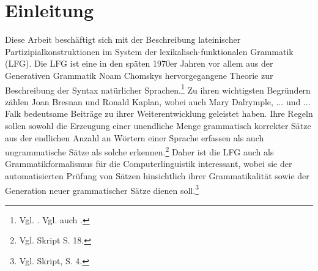 \documentclass[12pt,a4paper]{article}
\begin{document}

\setcounter{page}{2}
\begingroup
\flushbottom
\tableofcontents
\thispagestyle{empty}
\pagebreak
\endgroup

\nocite{Menge}
\nocite{LHS}
\nocite{KSt}
\nocite{Rohrer}
\nocite{Skript}
\nocite{Dal}
\nocite{Falk}
\nocite{Bresnan}
\nocite{Snijders}



\section{Einleitung}
Diese Arbeit beschäftigt sich mit der Beschreibung lateinischer Partizipialkonstruktionen im System der lexikalisch-funktionalen Grammatik (LFG). Die LFG ist eine in den späten 1970er Jahren vor allem aus der Generativen Grammatik Noam Chomskys hervorgegangene Theorie zur Beschreibung der Syntax natürlicher Sprachen.\footnote{Vgl. \cite[4]{Skript}. Vgl. auch \cite[1]{Dal}.} Zu ihren wichtigsten Begründern zählen Joan Bresnan und Ronald Kaplan, wobei auch Mary Dalrymple, ... und ... Falk bedeutsame Beiträge zu ihrer Weiterentwicklung geleistet haben.
Ihre Regeln sollen sowohl die Erzeugung einer unendliche Menge grammatisch korrekter Sätze aus der endlichen Anzahl an Wörtern einer Sprache erfassen als auch ungrammatische Sätze als solche erkennen.\footnote{Vgl. Skript S. 18.} Daher ist die LFG auch als Grammatikformalismus für die Computerlinguistik interessant, wobei sie der automatisierten Prüfung von Sätzen hinsichtlich ihrer Grammatikalität sowie der Generation neuer grammatischer Sätze dienen soll.\footnote{Vgl. Skript, S. 4.}
\end{document}
